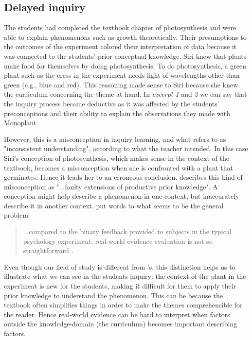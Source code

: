 \subsection{Delayed inquiry}
The students had completed the textbook chapter of photosynthesis and were able to explain phenomenons such as growth theoretically. Their presumptions to the outcomes of the experiment colored their interpretation of data because it was connected to the students' prior conceptual knowledge. Siri knew that plants make food for themselves by doing photosynthesis. To do photosynthesis, a green plant such as the cress in the experiment needs light of wavelengths other than green (e.g., blue and red). This reasoning made sense to Siri because she knew the curriculum concerning the theme at hand. In \emph{excerpt 1} and \emph{2} we can say that the inquiry process became deductive as it was affected by the students' preconceptions and their ability to explain the observations they made with Monoplant.

However, this is a misconception in inquiry learning, and what \citet{gomez2008elementary} refers to as "inconsistent understanding", according to what the teacher intended. In this case Siri's conception of photosynthesis, which makes sense in the context of the textbook, becomes a misconception when she is confronted with a plant that germinates. Hence it leads her to an erroneous conclusion. \citet[p. 512]{smith1994misconceptions} describes this kind of misconception as "...faulty extensions of productive prior knowledge". A conception might help describe a phenomenon in one context, but inaccurately describe it in another context. \citeauthor*{klahr1993heuristics} put words to what seems to be the general problem: 

\begin{quote}...compared to the binary feedback provided to subjects in the typical psychology experiment, real-world evidence evaluation is not so straightforward \citetext{\citealp{klahr1993heuristics}, referenced in \citealp{de1998scientific}, p. 186}.
\end{quote}

Even though our field of study is different from \citeauthor{klahr1993heuristics}'s, this distinction helps us to illustrate what we can see in the students inquiry: the context of the plant in the experiment is new for the students, making it difficult for them to apply their prior knowledge to understand the phenomenon. This can be because the textbook often simplifies things in order to make the themes comprehensible for the reader. Hence real-world evidence can be hard to interpret when factors outside the knowledge-domain (the curriculum) becomes important describing factors.

